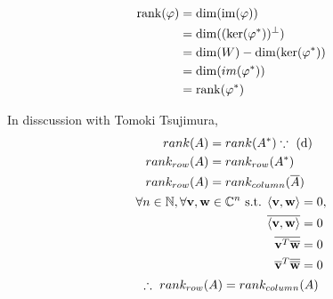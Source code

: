 \documentclass{mathtoolkit}
\begin{document}
\begin{p}
\begin{subp}
      \item
        \begin{align*}
          \mathrm{rank}(\varphi)
          & = \mathrm{dim}(\mathrm{im}(\varphi)) \\
          & = \mathrm{dim}((\mathrm{ker}(\varphi^*))^\perp) \\
          & = \mathrm{dim}(W) - \mathrm{dim}(\mathrm{ker}(\varphi^*)) \\
          & = \mathrm{dim}(im(\varphi^*)) \\
          & = \mathrm{rank}(\varphi^*)
        \end{align*}

      \item In disscussion with Tomoki Tsujimura,
        \begin{gather*}
          \begin{aligned}
            rank(A) & = rank(A^*) \because \text{(d)} \\
            rank_{row}(A) & = rank_{row}(A^*) \\
            rank_{row}(A) & = rank_{column}(\conj{A})
          \end{aligned} \\
          \begin{aligned}
            \forall n \in \field{N}, \forall \vec{v}, \vec{w} \in \field{C}^n
            \st \ip{\vec{v}}{\vec{w}} & = 0, \\
            \conj{\ip{\vec{v}}{\vec{w}}} & = 0 \\
            \conj{\vec{v}^T \conj{\vec{w}}} & = 0 \\
            \conj{\vec{v}}^T \conj{\conj{\vec{w}}} & = 0
          \end{aligned} \\
          \therefore rank_{row}(A) = rank_{column}(A)
        \end{gather*}
    \end{subp}
\end{p}
\end{document}
